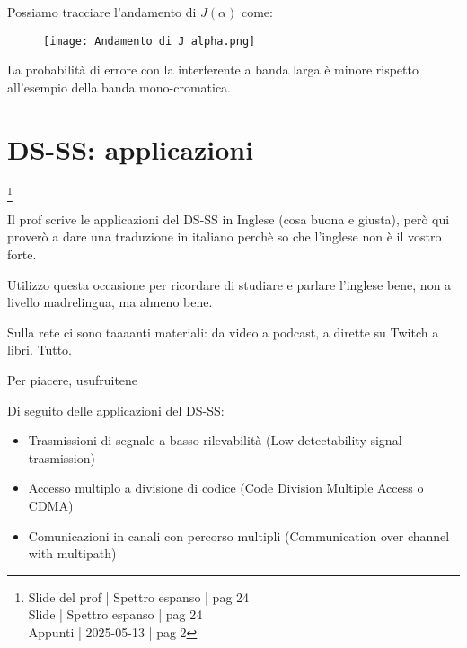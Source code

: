 Possiamo tracciare l'andamento di $J(\alpha)$ come: 

\begin{figure}[h]
    \centering
    \texttt{[image: Andamento di J alpha.png]}
\end{figure}

La probabilità di errore con la interferente a banda larga è minore 
rispetto all'esempio della banda mono-cromatica. \newline 

\newpage 

\section{DS-SS: applicazioni}
\footnote{Slide del prof | Spettro espanso | pag 24 \\
Slide | Spettro espanso | pag 24 \\
Appunti | 2025-05-13 | pag 2 
} 

\begin{tcolorbox}
    Il prof scrive le applicazioni del DS-SS in Inglese (cosa buona e giusta), 
    però qui proverò a dare una traduzione in italiano perchè so che l'inglese non è il vostro forte. \newline

    Utilizzo questa occasione per ricordare di studiare e parlare l'inglese bene, 
    non a livello madrelingua, ma almeno bene. \newline 

    Sulla rete ci sono taaaanti materiali: da video a podcast, a dirette su Twitch a libri. Tutto. \newline 

    Per piacere, usufruitene
\end{tcolorbox}


Di seguito delle applicazioni del DS-SS: 

\begin{itemize}
    \item Trasmissioni di segnale a basso rilevabilità (Low-detectability signal trasmission)
    \item Accesso multiplo a divisione di codice (Code Division Multiple Access o CDMA) 
    \item Comunicazioni in canali con percorso multipli (Communication over channel with multipath)
\end{itemize}

